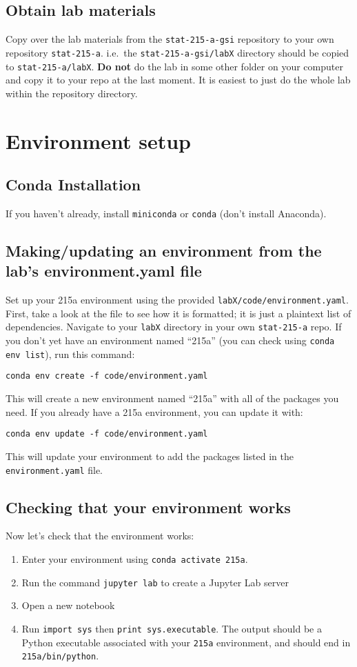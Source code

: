 \documentclass[letterpaper,12pt]{article}
\begin{document}
\subsection{Obtain lab materials}
Copy over the lab materials from the \texttt{stat-215-a-gsi} repository to your own repository \texttt{stat-215-a}. i.e.~the \texttt{stat-215-a-gsi/labX} directory should be copied to \texttt{stat-215-a/labX}. \textbf{Do not} do the lab in some other folder on your computer and copy it to your repo at the last moment. It is easiest to just do the whole lab within the repository directory.

\section{Environment setup}

\subsection{Conda Installation}
If you haven't already, install \texttt{miniconda} or \texttt{conda} (don't install Anaconda).

\subsection{Making/updating an environment from the lab's environment.yaml file}
Set up your 215a environment using the provided \texttt{labX/code/environment.yaml}. First, take a look at the file to see how it is formatted; it is just a plaintext list of dependencies. Navigate to your \texttt{labX} directory in your own \texttt{stat-215-a} repo. If you don't yet have an environment named ``215a'' (you can check using \texttt{conda env list}), run this command:
\begin{verbatim}
conda env create -f code/environment.yaml
\end{verbatim}
This will create a new environment named ``215a'' with all of the packages you need. If you already have a 215a environment, you can update it with:
\begin{verbatim}
conda env update -f code/environment.yaml
\end{verbatim}
This will update your environment to add the packages listed in the \texttt{environment.yaml} file.

\subsection{Checking that your environment works}
Now let's check that the environment works:
\begin{enumerate}
    \item Enter your environment using \texttt{conda activate 215a}.
    \item Run the command \texttt{jupyter lab} to create a Jupyter Lab server
    \item Open a new notebook
    \item Run \texttt{import sys} then \texttt{print sys.executable}. The output should be a Python executable associated with your \texttt{215a} environment, and should end in \texttt{215a/bin/python}.
\end{enumerate}
\end{document}
